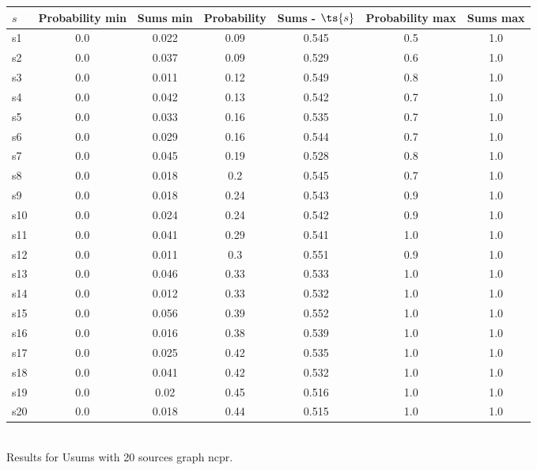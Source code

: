 \documentclass{article}
\begin{document}
\noindent\begin{tabular}{|l|c|c|c|c|c|c|}
\hline
$s$& Probability min & Sums min & Probability & Sums - $\ts{s}$ & Probability max & Sums max\\
\hline
s1 &0.0 & 0.022 & 0.09 & 0.545 & 0.5 & 1.0\\
\hline
s2 &0.0 & 0.037 & 0.09 & 0.529 & 0.6 & 1.0\\
\hline
s3 &0.0 & 0.011 & 0.12 & 0.549 & 0.8 & 1.0\\
\hline
s4 &0.0 & 0.042 & 0.13 & 0.542 & 0.7 & 1.0\\
\hline
s5 &0.0 & 0.033 & 0.16 & 0.535 & 0.7 & 1.0\\
\hline
s6 &0.0 & 0.029 & 0.16 & 0.544 & 0.7 & 1.0\\
\hline
s7 &0.0 & 0.045 & 0.19 & 0.528 & 0.8 & 1.0\\
\hline
s8 &0.0 & 0.018 & 0.2 & 0.545 & 0.7 & 1.0\\
\hline
s9 &0.0 & 0.018 & 0.24 & 0.543 & 0.9 & 1.0\\
\hline
s10 &0.0 & 0.024 & 0.24 & 0.542 & 0.9 & 1.0\\
\hline
s11 &0.0 & 0.041 & 0.29 & 0.541 & 1.0 & 1.0\\
\hline
s12 &0.0 & 0.011 & 0.3 & 0.551 & 0.9 & 1.0\\
\hline
s13 &0.0 & 0.046 & 0.33 & 0.533 & 1.0 & 1.0\\
\hline
s14 &0.0 & 0.012 & 0.33 & 0.532 & 1.0 & 1.0\\
\hline
s15 &0.0 & 0.056 & 0.39 & 0.552 & 1.0 & 1.0\\
\hline
s16 &0.0 & 0.016 & 0.38 & 0.539 & 1.0 & 1.0\\
\hline
s17 &0.0 & 0.025 & 0.42 & 0.535 & 1.0 & 1.0\\
\hline
s18 &0.0 & 0.041 & 0.42 & 0.532 & 1.0 & 1.0\\
\hline
s19 &0.0 & 0.02 & 0.45 & 0.516 & 1.0 & 1.0\\
\hline
s20 &0.0 & 0.018 & 0.44 & 0.515 & 1.0 & 1.0\\
\hline
\end{tabular}\\

\noindent Results for Usums with 20 sources graph ncpr.
\end{document}
